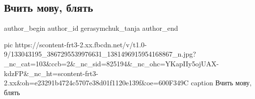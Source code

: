  
 
 
 
 
 
\subsection{Вчить мову, блять}
\label{sec:25_12_2020.fb.gerasymchuk_tanja.1.vchyt_movu}
\ifcmt
  author_begin
   author_id gerasymchuk_tanja
  author_end
\fi

\ifcmt
pic https://scontent-frt3-2.xx.fbcdn.net/v/t1.0-9/133043195_3867295539976631_1381496915954168867_n.jpg?_nc_cat=103&ccb=2&_nc_sid=825194&_nc_ohc=YKapIIy5ojUAX-kdzFP&_nc_ht=scontent-frt3-2.xx&oh=e23291b4724c5707e38d01f1120e139f&oe=600F349C
caption Вчить мову, блять
\fi
